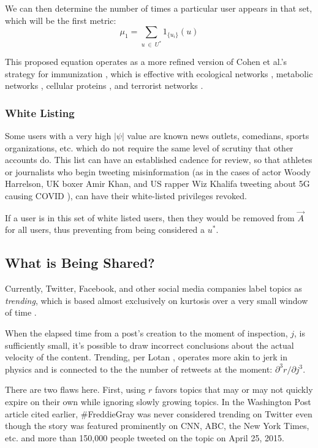 \documentclass[preprint,review,12pt]{elsarticle}
\begin{document}
We can then determine the number of times a particular user appears in that set, which will be the first metric: 
\begin{equation}
\label{mu_1 equation}
    \mu_1 = \sum_{u\ \in \ U^*}1_{\{u_i\}}(u)
\end{equation}

This proposed equation operates as a more refined version of Cohen et al.'s strategy for immunization \cite{cohen2003efficient}, which is effective with ecological networks \cite{sole2001complexity,camacho2002robust}, metabolic networks \cite{jeong2000large}, cellular proteins \cite{jeong2001lethality}, and terrorist networks \cite{cohen2003efficient}. 

\subsubsection{White Listing}
\label{sec: white listing}
Some users with a very high $|\psi|$ value are known news outlets, comedians, sports organizations, etc. which do not require the same level of scrutiny that other accounts do. This list can have an established cadence for review, so that athletes or journalists who begin tweeting misinformation (as in the cases of actor Woody Harrelson, UK boxer Amir Khan, and US rapper Wiz Khalifa tweeting about 5G causing COVID \cite{bruns2020covid19}), can have their white-listed privileges revoked. 

If a user is in this set of white listed users, then they would be removed from $\vec{A}$ for all users, thus preventing from being considered a $u^*$.

\subsection{What is Being Shared?}
\label{sec: what is being shared}
Currently, Twitter, Facebook, and other social media companies label topics as \textit{trending}, which is based almost exclusively on kurtosis over a very small window of time \cite{dewey2015freddie,lotan2015freddie}. 

When the elapsed time from a post's creation to the moment of inspection, $j$, is sufficiently small, it's possible to draw incorrect conclusions about the actual velocity of the content. Trending, per Lotan \cite{lotan2015freddie}, operates more akin to jerk in physics and is connected to the the number of retweets at the moment: $\partial^3 r / \partial j^3$.

There are two flaws here. First, using $r$ favors topics that may or may not quickly expire on their own while ignoring slowly growing topics. In the Washington Post article cited earlier, \#FreddieGray was never considered trending on Twitter even though the story was featured prominently on CNN, ABC, the New York Times, etc. and more than 150,000 people tweeted on the topic on April 25, 2015.
\end{document}
